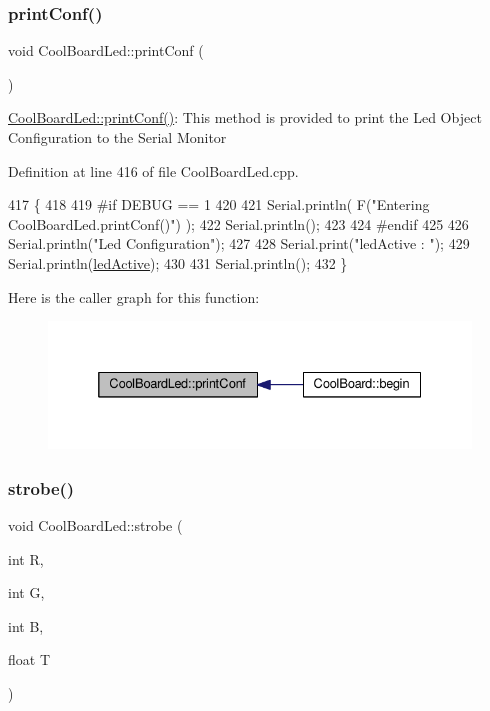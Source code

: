 \subsubsection{\texorpdfstring{print\+Conf()}{printConf()}}
{\footnotesize\ttfamily void Cool\+Board\+Led\+::print\+Conf (\begin{DoxyParamCaption}{ }\end{DoxyParamCaption})}

\hyperlink{class_cool_board_led_a8ed3053a36f0ed4a131f43b5b17efb61}{Cool\+Board\+Led\+::print\+Conf()}\+: This method is provided to print the Led Object Configuration to the Serial Monitor 

Definition at line 416 of file Cool\+Board\+Led.\+cpp.


\begin{DoxyCode}
417 \{
418 
419 \textcolor{preprocessor}{#if DEBUG == 1 }
420 
421     Serial.println( F(\textcolor{stringliteral}{"Entering CoolBoardLed.printConf()"}) );
422     Serial.println();
423 
424 \textcolor{preprocessor}{#endif}
425 
426     Serial.println(\textcolor{stringliteral}{"Led Configuration"});
427 
428     Serial.print(\textcolor{stringliteral}{"ledActive : "});
429     Serial.println(\hyperlink{class_cool_board_led_aadd04d2ecf123247718d77f42fba7f08}{ledActive});
430 
431     Serial.println();   
432 \}
\end{DoxyCode}
Here is the caller graph for this function\+:\nopagebreak
\begin{figure}[H]
\begin{center}
\leavevmode
\includegraphics[width=332pt]{de/dc0/class_cool_board_led_a8ed3053a36f0ed4a131f43b5b17efb61_icgraph}
\end{center}
\end{figure}
\mbox{\label{class_cool_board_led_ad5f0de4c628cbfbf49896042831c64ad}} 
\subsubsection{\texorpdfstring{strobe()}{strobe()}}
{\footnotesize\ttfamily void Cool\+Board\+Led\+::strobe (\begin{DoxyParamCaption}\item[{int}]{R,  }\item[{int}]{G,  }\item[{int}]{B,  }\item[{float}]{T }\end{DoxyParamCaption})}

